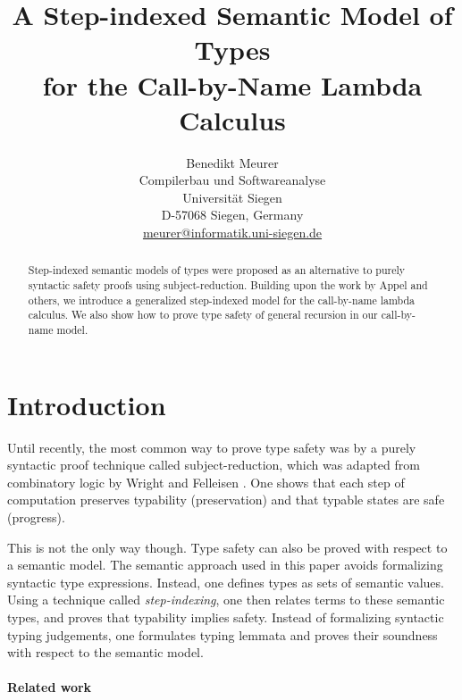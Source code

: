 \documentclass[10pt,a4paper,final,twocolumn]{article}
\theoremstyle{definition}
\theoremstyle{plain}
\begin{document}
\author{%
  Benedikt Meurer\\
  Compilerbau und Softwareanalyse\\
  Universit\"at Siegen\\
  D-57068 Siegen, Germany\\
  \url{meurer@informatik.uni-siegen.de}
}
\date{}
\title{
  A Step-indexed Semantic Model of Types\\
  for the Call-by-Name Lambda Calculus
}
\maketitle

\begin{abstract}
  Step-indexed semantic models of types were proposed as an alternative to purely syntactic
  safety proofs using subject-reduction. Building upon the work by Appel and others, we
  introduce a generalized step-indexed model for the call-by-name lambda calculus. We also
  show how to prove type safety of general recursion in our call-by-name model.
\end{abstract}


\section{Introduction}
\label{sec:Introduction}


Until recently, the most common way to prove type safety was by a purely syntactic proof
technique called subject-reduction, which was adapted from combinatory logic by Wright
and Felleisen \cite{WrightFelleisen94}. One shows that each step of computation preserves
typability (preservation) and that typable states are safe (progress).

This is not the only way though. Type safety can also be proved with respect to a semantic model. The
semantic approach used in this paper avoids formalizing syntactic type expressions. Instead, one defines 
types as sets of semantic values. Using a technique called \emph{step-indexing}, one then relates terms
to these semantic types, and proves that typability implies safety. Instead of formalizing syntactic
typing judgements, one formulates typing lemmata and proves their soundness with respect to the semantic
model.


\paragraph{Related work}
\label{par:Related_work}
\end{document}
